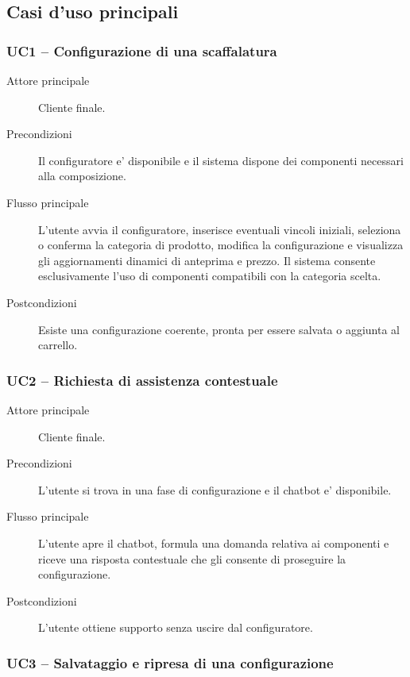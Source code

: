 \subsection{Casi d'uso principali}

\subsubsection{UC1 -- Configurazione di una scaffalatura}

\begin{description}
	\item[Attore principale] Cliente finale.
	\item[Precondizioni] Il configuratore e' disponibile e il sistema dispone dei componenti necessari alla composizione.
	\item[Flusso principale] L'utente avvia il configuratore, inserisce eventuali vincoli iniziali, seleziona o conferma la categoria di prodotto, modifica la configurazione e visualizza gli aggiornamenti dinamici di anteprima e prezzo. Il sistema consente esclusivamente l'uso di componenti compatibili con la categoria scelta.
	\item[Postcondizioni] Esiste una configurazione coerente, pronta per essere salvata o aggiunta al carrello.
\end{description}

\subsubsection{UC2 -- Richiesta di assistenza contestuale}

\begin{description}
	\item[Attore principale] Cliente finale.
	\item[Precondizioni] L'utente si trova in una fase di configurazione e il chatbot e' disponibile.
	\item[Flusso principale] L'utente apre il chatbot, formula una domanda relativa ai componenti e riceve una risposta contestuale che gli consente di proseguire la configurazione.
	\item[Postcondizioni] L'utente ottiene supporto senza uscire dal configuratore.
\end{description}

\subsubsection{UC3 -- Salvataggio e ripresa di una configurazione}

